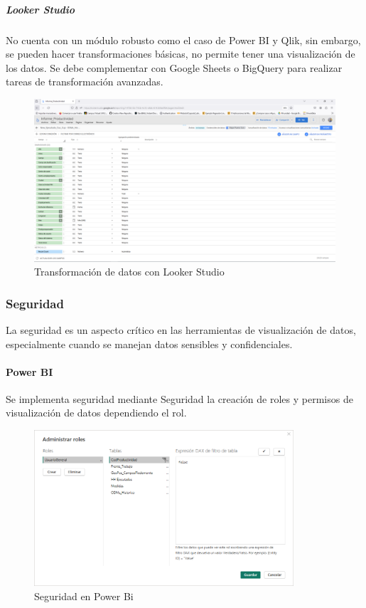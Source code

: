 \documentclass[
  11pt,
  bookmarksnumbered]{article}
\begin{document}
\hypertarget{looker-studio}{%
\subparagraph{Looker Studio}\label{looker-studio}}

No cuenta con un módulo robusto como el caso de Power BI y Qlik, sin embargo, se pueden hacer transformaciones básicas, no permite tener una visualización de los datos.
Se debe complementar con Google Sheets o BigQuery para realizar tareas de transformación avanzadas.

\begin{figure}

{\centering \includegraphics[width=4.78in]{media 2/image13} 

}

\caption{Transformación de datos con Looker Studio}\label{fig:unnamed-chunk-18}
\end{figure}

\newpage

\hypertarget{seguridad}{%
\subsubsection{Seguridad}\label{seguridad}}

La seguridad es un aspecto crítico en las herramientas de visualización de datos, especialmente cuando se manejan datos sensibles y confidenciales.

\hypertarget{power-bi-1}{%
\paragraph{Power BI}\label{power-bi-1}}

Se implementa seguridad mediante Seguridad la creación de roles y permisos de visualización de datos dependiendo el rol.

\begin{figure}

{\centering \includegraphics[width=3.8in]{media 2/image14} 

}

\caption{Seguridad en Power Bi}\label{fig:unnamed-chunk-19}
\end{figure}
\end{document}
